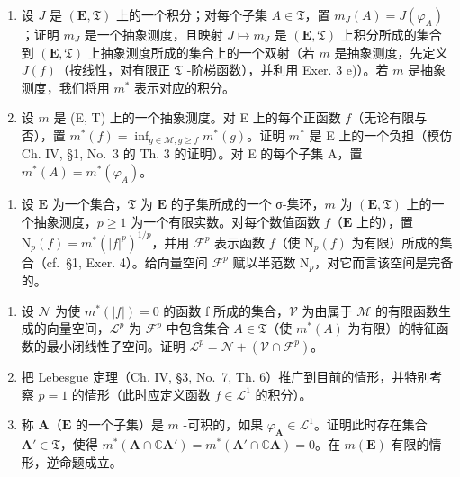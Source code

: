 \begin{enumerate}
\def\labelenumi{\alph{enumi})}
\item
  设 \(J\) 是 \((\mathbf{E},\mathfrak{T})\) 上的一个积分；对每个子集 \(A \in \mathfrak{T}\)，置 \(m_{J}(A) = J(\varphi_A)\)；证明 \(m_J\) 是一个抽象测度，且映射 \(J \mapsto m_J\) 是 \((\mathbf{E},\mathfrak{T})\) 上积分所成的集合到 \((\mathbf{E},\mathfrak{T})\) 上抽象测度所成的集合上的一个双射（若 \(m\) 是抽象测度，先定义 \(J(f)\)（按线性，对有限正 \(\mathfrak{T}\) -阶梯函数），并利用 Exer. 3 e)）。若 \(m\) 是抽象测度，我们将用 \(m^*\) 表示对应的积分。
\item
  设 \(m\) 是 (E, T) 上的一个抽象测度。对 E 上的每个正函数 \(f\)（无论有限与否），置 \(m^{*}(f) = \inf_{g \in \mathcal{M}, g \geqslant f} m^{*}(g)\)。证明 \(m^{*}\) 是 E 上的一个负担（模仿 Ch. IV, §1, No.~3 的 Th. 3 的证明）。对 E 的每个子集 A，置 \(m^{*}(A) = m^{*}(\varphi_{A})\)。
\end{enumerate}

\begin{enumerate}
\def\labelenumi{\arabic{enumi})}
\setcounter{enumi}{4}
\tightlist
\item
  设 \(\mathbf{E}\) 为一个集合，\(\mathfrak{T}\) 为 \(\mathbf{E}\) 的子集所成的一个 σ-集环，\(m\) 为 \((\mathbf{E},\mathfrak{T})\) 上的一个抽象测度，\(p\geqslant 1\) 为一个有限实数。对每个数值函数 \(f\)（\(\mathbf{E}\) 上的），置 \(\mathrm{N}_p(f) = m^* (|f|^p)^{1 / p}\)，并用 \(\mathcal{F}^p\) 表示函数 \(f\)（使 \(\mathrm{N}_p(f)\) 为有限）所成的集合（cf.~§1, Exer. 4）。给向量空间 \(\mathcal{F}^p\) 赋以半范数 \(\mathrm{N}_p\)，对它而言该空间是完备的。
\end{enumerate}

\begin{enumerate}
\def\labelenumi{\alph{enumi})}
\item
  设 \(\mathcal{N}\) 为使 \(m^{*}(|f|)=0\) 的函数 f 所成的集合，\(\mathcal{V}\) 为由属于 \(\mathcal{M}\) 的有限函数生成的向量空间，\(\mathcal{L}^{p}\) 为 \(\mathcal{F}^{p}\) 中包含集合 \(A\in \mathfrak{T}\)（使 \(m^{*}(A)\) 为有限）的特征函数的最小闭线性子空间。证明 \(\mathcal{L}^{p}=\mathcal{N}+(\mathcal{V}\cap\mathcal{F}^{p})\)。
\item
  把 Lebesgue 定理（Ch. IV, §3, No.~7, Th. 6）推广到目前的情形，并特别考察 \(p = 1\) 的情形（此时应定义函数 \(f \in \mathcal{L}^1\) 的积分）。
\item
  称 \(\mathbf{A}\)（\(\mathbf{E}\) 的一个子集）是 \(m\) -可积的，如果 \(\varphi_{\mathbf{A}} \in \mathcal{L}^1\)。证明此时存在集合 \(\mathbf{A}' \in \mathfrak{T}\)，使得 \(m^{*}(\mathbf{A} \cap \mathbb{C}\mathbf{A}') = m^{*}(\mathbf{A}' \cap \mathbb{C}\mathbf{A}) = 0\)。在 \(m(\mathbf{E})\) 有限的情形，逆命题成立。
\end{enumerate}

